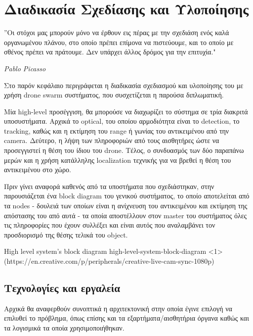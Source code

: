 \chapter{Διαδικασία Σχεδίασης και Υλοποίησης} %
\label{chap:Chapter4}  %

\epigraph{”Οι στόχοι μας μπορούν μόνο να έρθουν εις πέρας με την σχεδιάση ενός καλά οργανωμένου πλάνου, στο οποίο πρέπει επίμονα να πιστεύουμε, και το οποίο με σθένος πρέπει να πράτουμε. Δεν υπάρχει άλλος δρόμος για την επιτυχία." }{\textit{Pablo Picasso}}

Στο παρόν κεφάλαιο περιγράφεται η διαδικασία σχεδιασμού και υλοποίησης του  με χρήση drone swarm συστήματος, που συσχετίζεται η παρούσα διπλωματική. 

Μία high-level προσέγγιση, θα μπορούσε να διαχωρίζει το σύστημα σε τρία διακριτά
υποσυστήματα. Αρχικά το optical, του οποίου αρμοδιότητα είναι το detection, το tra\-cking, καθώς και η εκτίμηση
του range ή γωνίας του αντικειμένου από την camera. Δεύτερο, η λήψη των πληροφοριών από τους αισθητήρες ώστε να προσεγγιστεί η θέση του ίδιου
του drone. Τέλος, ο συνδυασμός των δύο παραπάνω μερών και η χρήση κατάλληλης localization τεχνικής για να βρεθεί η θέση του αντικειμένου
στο  χώρο.

Πριν γίνει αναφορά καθενός από τα υποστήματα που σχεδιάστηκαν, στην  παρουσιάζεται ένα block diagram του γενικού συστήματος, το οποίο αποτελείται από τα nodes - δουλειά των οποίων είναι η ανίχνευση του αντικειμένου και εκτίμηση της απόστασης του από αυτά - τα οποία αποστέλλουν στον master του συστήματος όλες τις πληροφορίες που έχουν συλλέξει και είναι αυτός που αναλαμβάνει τον προσδιορισμό της θέσης τελικά του object.

%
{High level system's block diagram}%
{high-level-system-block-diagram}%
<1>%
(https://en.creative.com/p/peripherals/creative-live-cam-sync-1080p)

\section{Τεχνολογίες και εργαλεία} \label{sec:design-tools}
Αρχικά θα αναφερθούν συνοπτικά η αρχιτεκτονική στην οποία έγινε επιλογή να επιλυθεί το πρόβλημα,
όπως επίσης και τα εξαρτήματα/αισθητήρια όργανα καθώς και τα λογισμικά τα οποία χρησιμοποιήθηκαν. 

